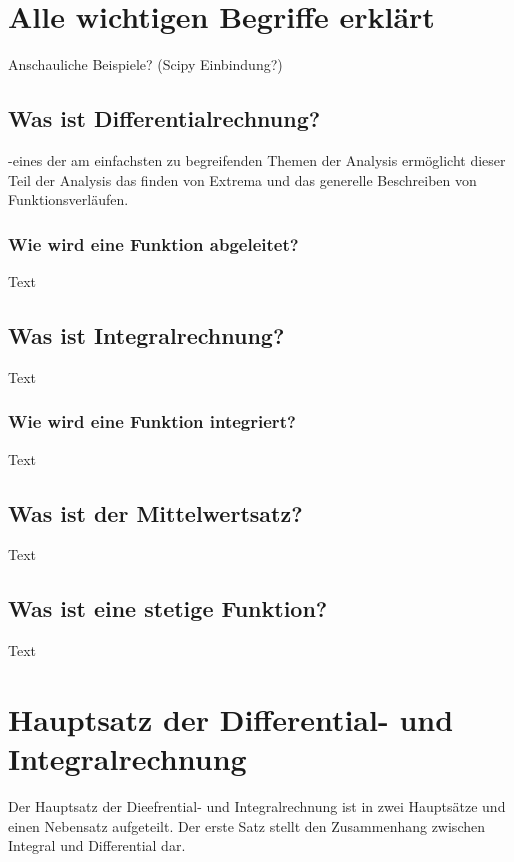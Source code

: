 \documentclass[fontsize=12pt,paper=a4,DIV12,cleardoublepage=empty, 
liststotoc,idxtotoc,bibtotoc]{article}
\theoremstyle{plain}
\theoremstyle{definition}
\begin{document}
	\section{Alle wichtigen Begriffe erklärt}
	Anschauliche Beispiele? (Scipy Einbindung?)
	
	
	\subsection{Was ist Differentialrechnung?}
	-eines der am einfachsten zu begreifenden Themen der Analysis ermöglicht dieser Teil der Analysis das finden von Extrema und das generelle Beschreiben von Funktionsverläufen.
	
	
	\subsubsection{Wie wird eine Funktion abgeleitet?}
		Text
	
	
	\subsection{Was ist Integralrechnung?}
		Text


	\subsubsection{Wie wird eine Funktion integriert?}
		Text
		
	
	\subsection{Was ist der Mittelwertsatz?}
		Text
		
	
	\subsection{Was ist eine stetige Funktion?}
		Text	
	
	
	
	
	\section{Hauptsatz der Differential- und Integralrechnung}
	
	Der Hauptsatz der Dieefrential- und Integralrechnung ist in zwei Hauptsätze und einen Nebensatz aufgeteilt. Der erste Satz stellt den Zusammenhang zwischen Integral und Differential dar.
\end{document}
